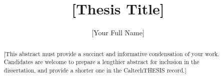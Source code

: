 \documentclass[12pt]{caltech_thesis}
\begin{document}
\title{[Thesis Title]}
\author{[Your Full Name]}

\address{Pasadena, California}                     %



\maketitle[logo]

\begin{acknowledgements} 	 
\end{acknowledgements}

\begin{abstract}
   [This abstract must provide a succinct and informative condensation of your work. Candidates are welcome to prepare a lengthier abstract for inclusion in the dissertation, and provide a shorter one in the CaltechTHESIS record.]
\end{abstract}

\begin{publishedcontent}%
\nocite{Cahn:etal:2015}
\end{publishedcontent}
\end{document}
